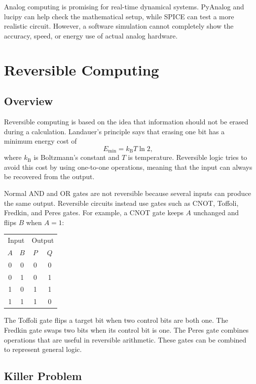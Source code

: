 \documentclass{article}
\begin{document}
Analog computing is promising for real-time dynamical systems. PyAnalog and lucipy can help check the mathematical setup, while SPICE can test a more realistic circuit. However, a software simulation cannot completely show the accuracy, speed, or energy use of actual analog hardware.


\section{Reversible Computing}

\subsection{Overview}

Reversible computing is based on the idea that information should not be erased during a calculation. Landauer's principle says that erasing one bit has a minimum energy cost of
\[
E_{\min}=k_{\mathrm{B}}T\ln 2,
\]
where $k_{\mathrm{B}}$ is Boltzmann's constant and $T$ is temperature. Reversible logic tries to avoid this cost by using one-to-one operations, meaning that the input can always be recovered from the output.

Normal AND and OR gates are not reversible because several inputs can produce the same output. Reversible circuits instead use gates such as CNOT, Toffoli, Fredkin, and Peres gates. For example, a CNOT gate keeps $A$ unchanged and flips $B$ when $A=1$:

\begin{center}
\begin{tabular}{cc|cc}
\toprule
\multicolumn{2}{c|}{Input} & \multicolumn{2}{c}{Output} \\
$A$ & $B$ & $P$ & $Q$ \\
\midrule
0 & 0 & 0 & 0 \\
0 & 1 & 0 & 1 \\
1 & 0 & 1 & 1 \\
1 & 1 & 1 & 0 \\
\bottomrule
\end{tabular}
\end{center}

The Toffoli gate flips a target bit when two control bits are both one. The Fredkin gate swaps two bits when its control bit is one. The Peres gate combines operations that are useful in reversible arithmetic. These gates can be combined to represent general logic.

\subsection{Killer Problem}
\end{document}
